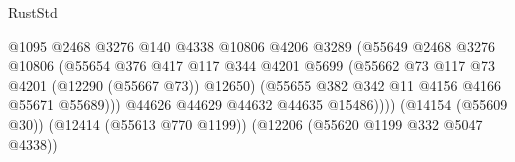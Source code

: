 \begin{lexlean}{RustStd}
\begin{coremodule}
{\begin{coremodule}
{{{{{{{{{{{{{{{{{{{{{{{{{{{{{{{{{{{{{{{{{{{{{{{{{{                                                    @1095
                                                    @2468
                                                    @3276
                                                    @140
                                                    @4338
                                                    @10806
                                                    @4206
                                                    @3289
                                                    (@55649
                                                      @2468
                                                      @3276
                                                      @10806
                                                      (@55654
                                                        @376
                                                        @417
                                                        @117
                                                        @344
                                                        @4201
                                                        @5699
                                                        (@55662
                                                          @73
                                                          @117
                                                          @73
                                                          @4201
                                                          (@12290 (@55667 @73))
                                                          @12650)
                                                        (@55655
                                                          @382
                                                          @342
                                                          @11
                                                          @4156
                                                          @4166
                                                          @55671
                                                          @55689)))
                                                    @44626
                                                    @44629
                                                    @44632
                                                    @44635
                                                    @15486))))
                                            (@14154 (@55609 @30))
                                            (@12414 (@55613 @770 @1199))
                                            (@12206 (@55620 @1199 @332 @5047 @4338))
}}}}}}}}}}}}}}}}}}}}}}}}}}}}}}}}}}}}}}}}}}}}}}}}}}
\end{coremodule}}
\end{coremodule}
\end{lexlean}
